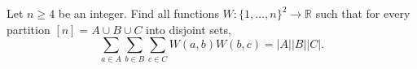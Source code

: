 Let $n \ge 4$ be an integer. Find all functions $W : \{1, \dots, n\}^2 \to \mathbb R$ such that for every partition $[n] = A \cup B \cup C$ into disjoint sets, \[ \sum_{a \in A} \sum_{b \in B} \sum_{c \in C} W(a,b) W(b,c) = |A| |B| |C|. \]